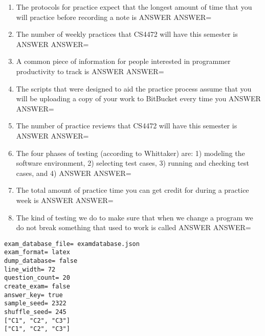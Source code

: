 \documentclass{exam}
\begin{document}
\begin{enumerate}
\item The protocols for practice expect that the longest amount of time that you will practice before recording a note is ANSWER\newline
ANSWER=
\item The number of weekly practices that CS4472 will have this semester is ANSWER\newline
ANSWER=
\item A common piece of information for people interested in programmer productivity to track is ANSWER\newline
ANSWER=
\item The scripts that were designed to aid the practice process assume that you will be uploading a copy of your work to BitBucket every time you ANSWER\newline
ANSWER=
\item The number of practice reviews that CS4472 will have this semester is ANSWER\newline
ANSWER=
\item The four phases of testing (according to Whittaker) are: 1) modeling the software environment, 2) selecting test cases, 3) running and checking test cases, and 4) ANSWER\newline
ANSWER=
\item The total amount of practice time you can get credit for during a practice week is ANSWER\newline
ANSWER=
\item The kind of testing we do to make sure that when we change a program we do not break something that used to work is called ANSWER\newline
ANSWER=
\end{enumerate}
\newpage
\begin{verbatim}
exam_database_file= examdatabase.json
exam_format= latex
dump_database= false
line_width= 72
question_count= 20
create_exam= false
answer_key= true
sample_seed= 2322
shuffle_seed= 245
["C1", "C2", "C3"]
["C1", "C2", "C3"]
\end{verbatim}
\end{document}
